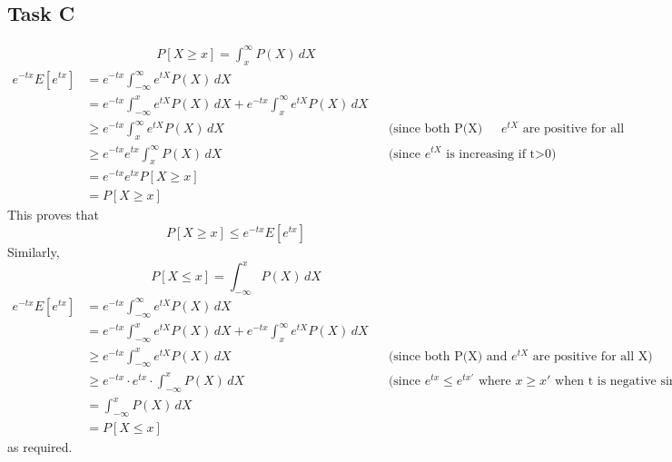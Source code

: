 \subsection{Task C}
\begin{align*}
    P[X\ge x] = \int_{x}^{\infty} P(X) \, dX
\end{align*}
\begin{align*}
    e^{-tx}E[e^{tx}] & = e^{-tx} \int_{-\infty}^{\infty} e^{tX} P(X) \, dX && \\
    & = e^{-tx}\int_{-\infty}^x e^{tX} P(X) \, dX + e^{-tx}\int_{x}^{\infty} e^{tX} P(X) \, dX && \\
    & \ge e^{-tx} \int_{x}^{\infty} e^{tX} P(X) \, dX && \text{(since both P(X) and $e^{tX}$ are positive for all X)}\\
    & \ge e^{-tx}  e^{tx} \int_{x}^{\infty} P(X) \, dX &&\text{(since $e^{tX}$ is increasing if t>0)}\\
    & = e^{-tx} e^{tx} P[X \ge x] && \\
    & = P[X \ge x] &&
\end{align*}
This proves that 
\begin{equation}
    \label{eq:1}
    P[X\ge x] \le e^{-tx}E[e^{tx}]
\end{equation}
Similarly, 
\[
    P[X\le x] = \int_{-\infty}^{x} P(X) \, dX
\]
\begin{align*}
    e^{-tx}E[e^{tx}] & = e^{-tx} \int_{-\infty}^{\infty} e^{tX} P(X) \, dX && \\
    & = e^{-tx}\int_{-\infty}^x e^{tX} P(X) \, dX + e^{-tx}\int_{x}^{\infty} e^{tX} P(X) \, dX && \\
    & \ge e^{-tx} \int_{-\infty}^{x} e^{tX} P(X) \, dX && \text{(since both P(X) and $e^{tX}$ are positive for all X)}\\
    & \ge e^{-tx}\cdot e^{tx} \cdot \int_{-\infty}^{x}P(X)\, dX && \text{(since $e^{tx} \le e^{tx'}$ where $x \ge x'$ when t is negative since $e^{-x}$ is a decreasing function)}\\
    & = \int_{-\infty}^{x} P(X) \, dX && \\
    & = P[X \le x] &&
    \label{eq:1}
\end{align*}
as required.

